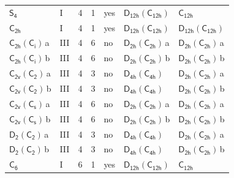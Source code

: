 \documentclass[10pt,a4paper]{article}
\numberwithin{equation}{section}
\newcommand{\grp}[1]{\mathsf{#1}}
\newcommand{\clsletter}[1]{\,{\scriptsize\color{black!55}#1}}
\begin{document}
{\begin{longtable}{@{}llrrlll@{}}
\href{../../../rotation/data/pdf/S4.pdf}{$\grp{S_{4}}$} & I & 4 & 1 & yes & \href{D12h-C12h.pdf}{$\grp{D_{12h}}(\grp{C_{12h}})$} & \href{../../../rotation/data/pdf/C12h.pdf}{$\grp{C_{12h}}$}\\
\href{../../../rotation/data/pdf/C2h.pdf}{$\grp{C_{2h}}$} & I & 4 & 1 & yes & \href{D12h-C12h.pdf}{$\grp{D_{12h}}(\grp{C_{12h}})$} & \href{D12h-C12h.pdf}{$\grp{D_{12h}}(\grp{C_{12h}})$}\\
\href{C2h-S2.pdf}{$\grp{C_{2h}}(\grp{C_{i}})$}\clsletter{a} & III & 4 & 6 & no & \href{D2h-C2h.pdf}{$\grp{D_{2h}}(\grp{C_{2h}})$}\clsletter{a} & \href{D2h-C2h.pdf}{$\grp{D_{2h}}(\grp{C_{2h}})$}\clsletter{a}\\
\href{C2h-S2.pdf}{$\grp{C_{2h}}(\grp{C_{i}})$}\clsletter{b} & III & 4 & 6 & no & \href{D2h-C2h.pdf}{$\grp{D_{2h}}(\grp{C_{2h}})$}\clsletter{b} & \href{D2h-C2h.pdf}{$\grp{D_{2h}}(\grp{C_{2h}})$}\clsletter{b}\\
\href{C2v-C2.pdf}{$\grp{C_{2v}}(\grp{C_{2}})$}\clsletter{a} & III & 4 & 3 & no & \href{D4h-C4h.pdf}{$\grp{D_{4h}}(\grp{C_{4h}})$} & \href{D2h-C2h.pdf}{$\grp{D_{2h}}(\grp{C_{2h}})$}\clsletter{a}\\
\href{C2v-C2.pdf}{$\grp{C_{2v}}(\grp{C_{2}})$}\clsletter{b} & III & 4 & 3 & no & \href{D4h-C4h.pdf}{$\grp{D_{4h}}(\grp{C_{4h}})$} & \href{D2h-C2h.pdf}{$\grp{D_{2h}}(\grp{C_{2h}})$}\clsletter{b}\\
\href{C2v-C1v.pdf}{$\grp{C_{2v}}(\grp{C_{s}})$}\clsletter{a} & III & 4 & 6 & no & \href{D2h-C2h.pdf}{$\grp{D_{2h}}(\grp{C_{2h}})$}\clsletter{a} & \href{D2h-C2h.pdf}{$\grp{D_{2h}}(\grp{C_{2h}})$}\clsletter{a}\\
\href{C2v-C1v.pdf}{$\grp{C_{2v}}(\grp{C_{s}})$}\clsletter{b} & III & 4 & 6 & no & \href{D2h-C2h.pdf}{$\grp{D_{2h}}(\grp{C_{2h}})$}\clsletter{b} & \href{D2h-C2h.pdf}{$\grp{D_{2h}}(\grp{C_{2h}})$}\clsletter{b}\\
\href{D2-C2.pdf}{$\grp{D_{2}}(\grp{C_{2}})$}\clsletter{a} & III & 4 & 3 & no & \href{D4h-C4h.pdf}{$\grp{D_{4h}}(\grp{C_{4h}})$} & \href{D2h-C2h.pdf}{$\grp{D_{2h}}(\grp{C_{2h}})$}\clsletter{a}\\
\href{D2-C2.pdf}{$\grp{D_{2}}(\grp{C_{2}})$}\clsletter{b} & III & 4 & 3 & no & \href{D4h-C4h.pdf}{$\grp{D_{4h}}(\grp{C_{4h}})$} & \href{D2h-C2h.pdf}{$\grp{D_{2h}}(\grp{C_{2h}})$}\clsletter{b}\\
\href{../../../rotation/data/pdf/C6.pdf}{$\grp{C_{6}}$} & I & 6 & 1 & yes & \href{D12h-C12h.pdf}{$\grp{D_{12h}}(\grp{C_{12h}})$} & \href{../../../rotation/data/pdf/C12h.pdf}{$\grp{C_{12h}}$}\\

\end{longtable}}
\end{document}
